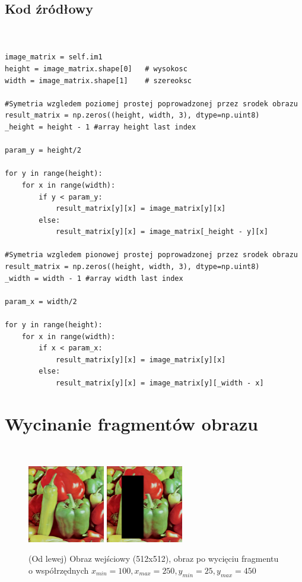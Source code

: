 \documentclass[final,a4paper,openany,12pt]{mwbk}
\begin{document}
\subsection*{Kod źródłowy}

\begin{lstlisting}[caption= Symetrie względem zadanej prostej]


image_matrix = self.im1
height = image_matrix.shape[0]   # wysokosc
width = image_matrix.shape[1]    # szereoksc

#Symetria wzgledem poziomej prostej poprowadzonej przez srodek obrazu
result_matrix = np.zeros((height, width, 3), dtype=np.uint8)
_height = height - 1 #array height last index

param_y = height/2

for y in range(height):
    for x in range(width): 
        if y < param_y:
            result_matrix[y][x] = image_matrix[y][x]
        else:
            result_matrix[y][x] = image_matrix[_height - y][x]

#Symetria wzgledem pionowej prostej poprowadzonej przez srodek obrazu
result_matrix = np.zeros((height, width, 3), dtype=np.uint8)
_width = width - 1 #array width last index

param_x = width/2

for y in range(height):
    for x in range(width): 
        if x < param_x:
            result_matrix[y][x] = image_matrix[y][x]
        else:
            result_matrix[y][x] = image_matrix[y][_width - x]

\end{lstlisting}



\section{ Wycinanie fragmentów obrazu}
\hfill\\
\indent

\begin{figure}[H]
	\begin{center}
		\includegraphics[width=0.3\textwidth]{1/1Geo_Cut_Original}
		\includegraphics[width=0.3\textwidth]{1/1Geo_Cut_Result}
	\end{center}
	\caption{(Od lewej) Obraz wejściowy (512x512), obraz po wycięciu fragmentu o współrzędnych $x_{min}=100, x_{max}=250, y_{min}=25, y_{max}=450$ }
\end{figure}
\end{document}
